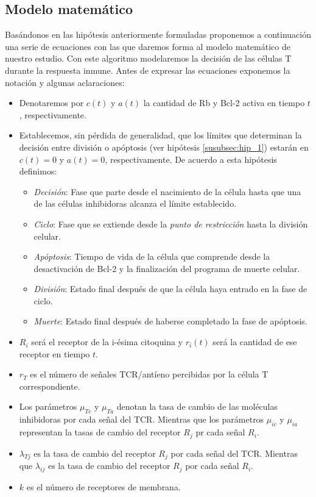 \subsection{Modelo matemático}

Basándonos en las hipótesis anteriormente formuladas proponemos a continuación una serie de ecuaciones con las que daremos forma al modelo matemático de nuestro estudio. Con este algoritmo modelaremos la decisión de las células T durante la respuesta inmune. 
Antes de expresar las ecuaciones exponemos la notación y algunas aclaraciones: 

\begin{itemize}
\item Denotaremos por \textit{$c(t)$} y \textit{$a(t)$} la cantidad de Rb y Bcl-2 activa en tiempo $t$, respectivamente.
\item Establecemos, sin pérdida de generalidad, que los límites que determinan la decisión entre división o apóptosis (ver hipótesis \ref{susubsec:hip_1}) estarán en $c(t)=0$ y $a(t)=0$, respectivamente. De acuerdo a esta hipótesis definimos: 
	\begin{itemize}
		\item \textit{Decisión}: Fase que parte desde el nacimiento de la célula hasta que una de las células inhibidoras alcanza el límite establecido.
		\item \textit{Ciclo}: Fase que se extiende desde la \textit{punto de restricción} hasta la división celular.
		\item \textit{Apóptosis}: Tiempo de vida de la célula que comprende desde la desactivación de Bcl-2 y la finalización del programa de muerte celular.
		\item \textit{División}: Estado final después de que la célula haya entrado en la fase de ciclo.
		\item \textit{Muerte}: Estado final después de haberse completado la fase de apóptosis.
	\end{itemize}
\item \textit{$R_{i}$} será el receptor de la i-ésima citoquina y \textit{$r_{i}(t)$} será la cantidad de ese receptor en tiempo $t$. 
\item $r_{T}$ es el número de señales TCR/antíeno  percibidas por la célula T correspondiente.
\item Los parámetros $\mu_{Tc}$ y $\mu_{Ta}$ denotan la tasa de cambio de las moléculas inhibidoras por cada señal del TCR. Mientras que los parámetros $\mu_{ic}$ y $\mu_{ia}$ representan la tasas de cambio del receptor $R_j$ pr cada señal $R_i$.
\item $\lambda_{Tj}$ es la tasa de cambio del receptor $R_{j}$ por cada señal del TCR. Mientras que $\lambda_{ij}$ es la tasa de cambio del receptor $R_j$ por cada señal $R_i$.
\item $k$ es el número de receptores de membrana.
\end{itemize} 

